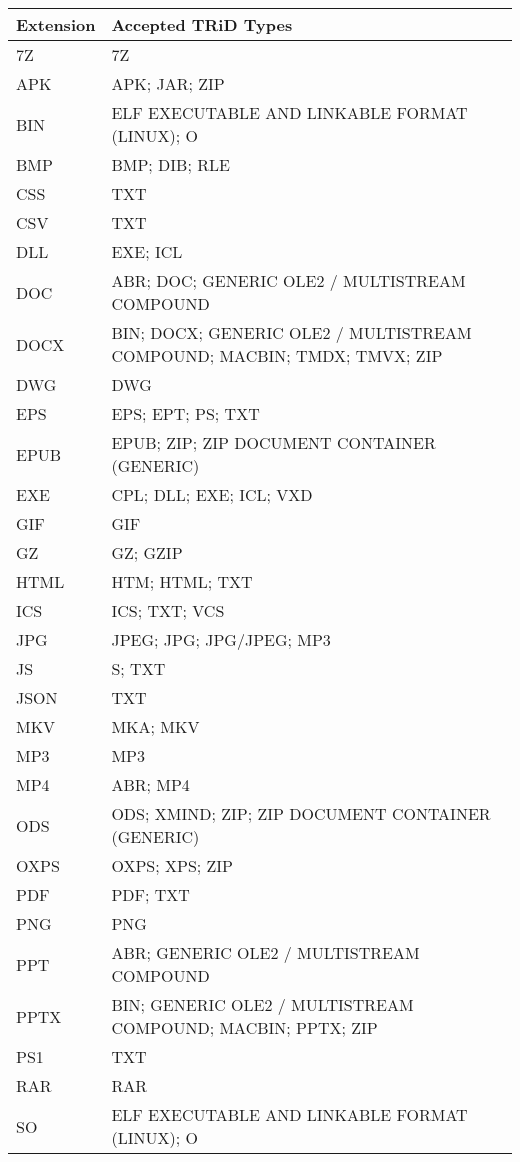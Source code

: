 \begin{tabular}{|l|p{10cm}|}
\toprule
\textbf{Extension} & \textbf{Accepted TRiD Types} \\
\midrule
7Z & 7Z \\
\hline
APK & APK; JAR; ZIP \\
\hline
BIN & ELF EXECUTABLE AND LINKABLE FORMAT (LINUX); O \\
\hline
BMP & BMP; DIB; RLE \\
\hline
CSS & TXT \\
\hline
CSV & TXT \\
\hline
DLL & EXE; ICL \\
\hline
DOC & ABR; DOC; GENERIC OLE2 / MULTISTREAM COMPOUND \\
\hline
DOCX & BIN; DOCX; GENERIC OLE2 / MULTISTREAM COMPOUND; MACBIN; TMDX; TMVX; ZIP \\
\hline
DWG & DWG \\
\hline
EPS & EPS; EPT; PS; TXT \\
\hline
EPUB & EPUB; ZIP; ZIP DOCUMENT CONTAINER (GENERIC) \\
\hline
EXE & CPL; DLL; EXE; ICL; VXD \\
\hline
GIF & GIF \\
\hline
GZ & GZ; GZIP \\
\hline
HTML & HTM; HTML; TXT \\
\hline
ICS & ICS; TXT; VCS \\
\hline
JPG & JPEG; JPG; JPG/JPEG; MP3 \\
\hline
JS & S; TXT \\
\hline
JSON & TXT \\
\hline
MKV & MKA; MKV \\
\hline
MP3 & MP3 \\
\hline
MP4 & ABR; MP4 \\
\hline
ODS & ODS; XMIND; ZIP; ZIP DOCUMENT CONTAINER (GENERIC) \\
\hline
OXPS & OXPS; XPS; ZIP \\
\hline
PDF & PDF; TXT \\
\hline
PNG & PNG \\
\hline
PPT & ABR; GENERIC OLE2 / MULTISTREAM COMPOUND \\
\hline
PPTX & BIN; GENERIC OLE2 / MULTISTREAM COMPOUND; MACBIN; PPTX; ZIP \\
\hline
PS1 & TXT \\
\hline
RAR & RAR \\
\hline
SO & ELF EXECUTABLE AND LINKABLE FORMAT (LINUX); O \\

\end{tabular}
